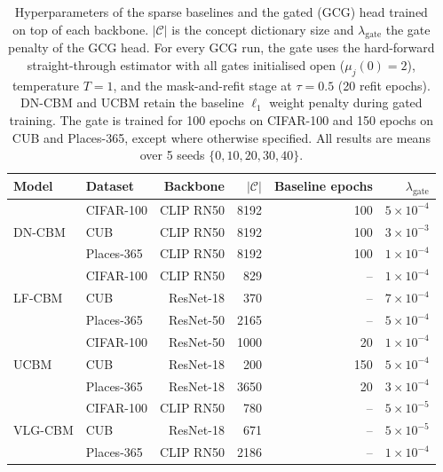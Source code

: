 \begin{table}[t]
\centering
\small
\setlength{\tabcolsep}{4pt}
\begin{tabular}{llrrrr}
\toprule
\textbf{Model} & \textbf{Dataset} & \textbf{Backbone} & $|\mathcal{C}|$ &
\textbf{Baseline epochs} & $\lambda_{\text{gate}}$ \\
\midrule

\multirow{3}{*}{DN-CBM}
& CIFAR-100  & CLIP RN50 & 8192 & 100 & $5\times10^{-4}$ \\
& CUB        & CLIP RN50 & 8192 & 100 & $3\times10^{-3}$ \\
& Places-365 & CLIP RN50 & 8192 & 100 & $1\times10^{-4}$ \\

\midrule

\multirow{3}{*}{LF-CBM}
& CIFAR-100  & CLIP RN50 & 829  & -- & $1\times10^{-4}$ \\
& CUB        & ResNet-18 & 370  & -- & $7\times10^{-4}$ \\
& Places-365 & ResNet-50 & 2165 & -- & $5\times10^{-4}$ \\

\midrule

\multirow{3}{*}{UCBM}
& CIFAR-100  & ResNet-50 & 1000 & 20  & $1\times10^{-4}$ \\
& CUB        & ResNet-18 & 200  & 150 & $5\times10^{-4}$ \\
& Places-365 & ResNet-18 & 3650 & 20  & $3\times10^{-4}$ \\

\midrule

\multirow{3}{*}{VLG-CBM}
& CIFAR-100  & CLIP RN50 & 780  & -- & $5\times10^{-5}$ \\
& CUB        & ResNet-18 & 671  & -- & $5\times10^{-5}$ \\
& Places-365 & CLIP RN50 & 2186 & -- & $1\times10^{-4}$ \\

\bottomrule
\end{tabular}

\caption{Hyperparameters of the sparse baselines and the gated (GCG) head
trained on top of each backbone. $|\mathcal{C}|$ is the concept dictionary
size and $\lambda_{\text{gate}}$ the gate penalty of the GCG head. For every
GCG run, the gate uses the hard-forward straight-through estimator with all
gates initialised open ($\mu_j(0)=2$), temperature $T=1$, and the
mask-and-refit stage at $\tau=0.5$ (20 refit epochs). DN-CBM and UCBM retain
the baseline $\ell_1$ weight penalty during gated training. The gate is
trained for 100 epochs on CIFAR-100 and 150 epochs on CUB and Places-365,
except where otherwise specified. All results are means over 5 seeds
$\{0,10,20,30,40\}$.}
\label{tab:hyperparams}
\end{table}
